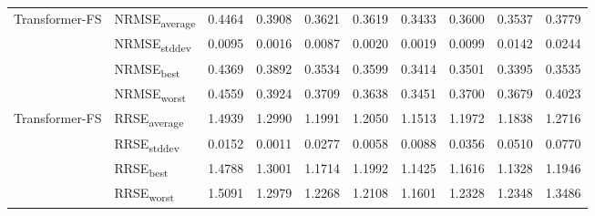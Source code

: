 {\begin{longtable}{l l c c c c c c c c}
\cmidrule(lr){2-10}
\multirow{4}{*}{Transformer-FS} & NRMSE\textsubscript{average} & 0.4464 & 0.3908 & 0.3621 & 0.3619 & 0.3433 & 0.3600 & 0.3537 & 0.3779 \\
 & NRMSE\textsubscript{stddev} & 0.0095 & 0.0016 & 0.0087 & 0.0020 & 0.0019 & 0.0099 & 0.0142 & 0.0244 \\
 & NRMSE\textsubscript{best} & 0.4369 & 0.3892 & 0.3534 & 0.3599 & 0.3414 & 0.3501 & 0.3395 & 0.3535 \\
 & NRMSE\textsubscript{worst} & 0.4559 & 0.3924 & 0.3709 & 0.3638 & 0.3451 & 0.3700 & 0.3679 & 0.4023 \\
\cmidrule(lr){2-10}
\multirow{4}{*}{Transformer-FS} & RRSE\textsubscript{average} & 1.4939 & 1.2990 & 1.1991 & 1.2050 & 1.1513 & 1.1972 & 1.1838 & 1.2716 \\
 & RRSE\textsubscript{stddev} & 0.0152 & 0.0011 & 0.0277 & 0.0058 & 0.0088 & 0.0356 & 0.0510 & 0.0770 \\
 & RRSE\textsubscript{best} & 1.4788 & 1.3001 & 1.1714 & 1.1992 & 1.1425 & 1.1616 & 1.1328 & 1.1946 \\
 & RRSE\textsubscript{worst} & 1.5091 & 1.2979 & 1.2268 & 1.2108 & 1.1601 & 1.2328 & 1.2348 & 1.3486 \\
\cmidrule(lr){2-10}
\end{longtable}
}